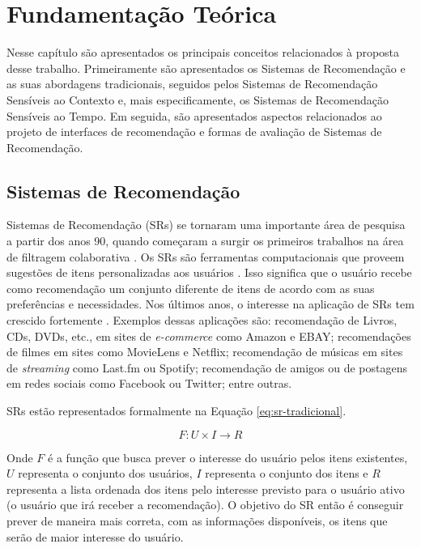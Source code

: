 \chapter{Fundamentação Teórica}\label{chapter:fundamentacao-teorica}

Nesse capítulo são apresentados os principais conceitos relacionados à proposta desse trabalho. Primeiramente são apresentados
os Sistemas de Recomendação e as suas abordagens tradicionais, seguidos pelos Sistemas de Recomendação Sensíveis ao Contexto
e, mais especificamente, os Sistemas de Recomendação Sensíveis ao Tempo. Em seguida, são apresentados aspectos relacionados ao
projeto de interfaces de recomendação e formas de avaliação de Sistemas de Recomendação.

\section{Sistemas de Recomendação}

Sistemas de Recomendação (SRs) se tornaram uma importante área de pesquisa a partir dos anos 90, quando começaram a
surgir os primeiros trabalhos na área de filtragem colaborativa \cite{adomavicius2005toward}. Os SRs são ferramentas
computacionais que proveem sugestões de itens personalizadas aos usuários \cite{ricci2011introduction}. Isso significa
que o usuário recebe como recomendação um conjunto diferente de itens de acordo com as suas preferências e necessidades.
Nos últimos anos, o interesse na aplicação de SRs tem crescido fortemente \cite{adomavicius2005toward, beel2016towards}.
Exemplos dessas aplicações são: recomendação de Livros, CDs, DVDs, etc., em sites de \textit{e-commerce} como Amazon e EBAY;
recomendações de filmes em sites como MovieLens e Netflix; recomendação de músicas em sites de \textit{streaming} como Last.fm ou
Spotify; recomendação de amigos ou de postagens em redes sociais como Facebook ou Twitter; entre outras.

SRs estão representados formalmente na Equação \ref{eq:sr-tradicional}.

\begin{equation}
  F: U \times I \rightarrow R
  \label{eq:sr-tradicional}
\end{equation}

Onde $F$ é a função que busca prever o interesse do usuário pelos itens existentes, $U$ representa o conjunto dos usuários,
$I$ representa o conjunto dos itens e $R$ representa a lista ordenada dos itens pelo interesse previsto para o usuário ativo
(o usuário que irá receber a recomendação). O objetivo do SR então é conseguir prever de maneira mais correta, com as
informações disponíveis, os itens que serão de maior interesse do usuário.

